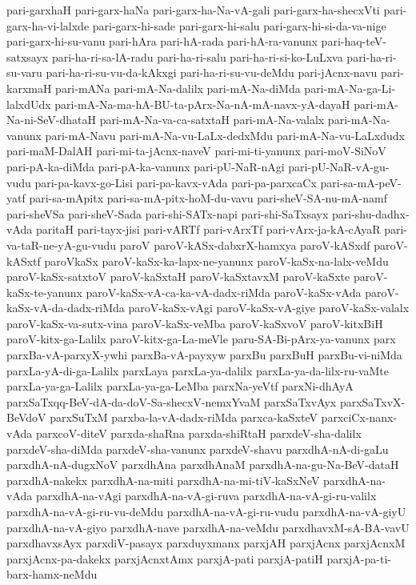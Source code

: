 {pari-garxhaH
pari-garx-haNa
pari-garx-ha-Na-vA-gali
pari-garx-ha-shecxVti
pari-garx-ha-vi-lalxde
pari-garx-hi-sade
pari-garx-hi-salu
pari-garx-hi-si-da-va-nige
pari-garx-hi-su-vanu
pari-hAra
pari-hA-rada
pari-hA-ra-vanunx
pari-haq-teV-satxsayx
pari-ha-ri-sa-lA-radu
pari-ha-ri-salu
pari-ha-ri-si-ko-LuLxva
pari-ha-ri-su-varu
pari-ha-ri-su-vu-da-kAkxgi
pari-ha-ri-su-vu-deMdu
pari-jAcnx-navu
pari-karxmaH
pari-mANa
pari-mA-Na-dalilx
pari-mA-Na-diMda
pari-mA-Na-ga-Li-lalxdUdx
pari-mA-Na-ma-hA-BU-ta-pArx-Na-nA-mA-navx-yA-dayaH
pari-mA-Na-ni-SeV-dhataH
pari-mA-Na-va-ca-satxtaH
pari-mA-Na-valalx
pari-mA-Na-vanunx
pari-mA-Navu
pari-mA-Na-vu-LaLx-dedxMdu
pari-mA-Na-vu-LaLxdudx
pari-maM-DalAH
pari-mi-ta-jAcnx-naveV
pari-mi-ti-yanunx
pari-moV-SiNoV
pari-pA-ka-diMda
pari-pA-ka-vanunx
pari-pU-NaR-nAgi
pari-pU-NaR-vA-gu-vudu
pari-pa-kavx-go-Lisi
pari-pa-kavx-vAda
pari-pa-parxcaCx
pari-sa-mA-peV-yatf
pari-sa-mApitx
pari-sa-mA-pitx-hoM-du-vavu
pari-sheV-SA-nu-mA-namf
pari-sheVSa
pari-sheV-Sada
pari-shi-SATx-napi
pari-shi-SaTxsayx
pari-shu-dadhx-vAda
paritaH
pari-tayx-jisi
pari-vARTf
pari-vArxTf
pari-vArx-ja-kA-cAyaR
pari-va-taR-ne-yA-gu-vudu
paroV
paroV-kASx-dabxrX-hamxya
paroV-kASxdf
paroV-kASxtf
paroVkaSx
paroV-kaSx-ka-lapx-ne-yanunx
paroV-kaSx-na-lalx-veMdu
paroV-kaSx-satxtoV
paroV-kaSxtaH
paroV-kaSxtavxM
paroV-kaSxte
paroV-kaSx-te-yanunx
paroV-kaSx-vA-ca-ka-vA-dadx-riMda
paroV-kaSx-vAda
paroV-kaSx-vA-da-dadx-riMda
paroV-kaSx-vAgi
paroV-kaSx-vA-giye
paroV-kaSx-valalx
paroV-kaSx-va-sutx-vina
paroV-kaSx-veMba
paroV-kaSxvoV
paroV-kitxBiH
paroV-kitx-ga-Lalilx
paroV-kitx-ga-La-meVle
paru-SA-Bi-pArx-ya-vanunx
parx
parxBa-vA-parxyX-ywhi
parxBa-vA-payxyw
parxBu
parxBuH
parxBu-vi-niMda
parxLa-yA-di-ga-Lalilx
parxLaya
parxLa-ya-dalilx
parxLa-ya-da-lilx-ru-vaMte
parxLa-ya-ga-Lalilx
parxLa-ya-ga-LeMba
parxNa-yeVtf
parxNi-dhAyA
parxSaTxqq-BeV-dA-da-doV-Sa-shecxV-nemxYvaM
parxSaTxvAyx
parxSaTxvX-BeVdoV
parxSuTxM
parxba-la-vA-dadx-riMda
parxca-kaSxteV
parxciCx-nanx-vAda
parxcoV-diteV
parxda-shaRna
parxda-shiRtaH
parxdeV-sha-dalilx
parxdeV-sha-diMda
parxdeV-sha-vanunx
parxdeV-shavu
parxdhA-nA-di-gaLu
parxdhA-nA-dugxNoV
parxdhAna
parxdhAnaM
parxdhA-na-gu-Na-BeV-dataH
parxdhA-nakekx
parxdhA-na-miti
parxdhA-na-mi-tiV-kaSxNeV
parxdhA-na-vAda
parxdhA-na-vAgi
parxdhA-na-vA-gi-ruva
parxdhA-na-vA-gi-ru-valilx
parxdhA-na-vA-gi-ru-vu-deMdu
parxdhA-na-vA-gi-ru-vudu
parxdhA-na-vA-giyU
parxdhA-na-vA-giyo
parxdhA-nave
parxdhA-na-veMdu
parxdhavxM-sA-BA-vavU
parxdhavxsAyx
parxdiV-pasayx
parxduyxmanx
parxjAH
parxjAcnx
parxjAcnxM
parxjAcnx-pa-dakekx
parxjAcnxtAmx
parxjA-pati
parxjA-patiH
parxjA-pa-ti-barx-hamx-neMdu
}
